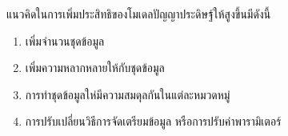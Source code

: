 แนวคิดในการเพิ่มประสิทธิของโมเดลปัญญาประดิษฐ์ให้สูงขึ้นมีดังนี้
\begin{enumerate}
	\item เพิ่มจำนวนชุดข้อมูล
	\item เพิ่มความหลากหลายให้กับชุดข้อมูล
	\item การทำชุดข้อมูลให่มีความสมดุลกันในแต่ละหมวดหมู่
	\item การปรับเปลี่ยนวิธีการจัดเตรียมข้อมูล หรือการปรับค่าพารามิเตอร์
\end{enumerate}